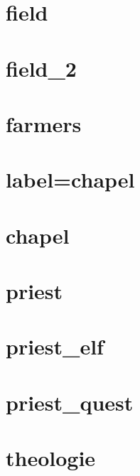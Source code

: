 \section{field}
\section{field_2}
\section{farmers}
\section{label=chapel}
\section{chapel}
\section{priest}
\section{priest_elf}
\section{priest_quest}
\section{theologie}
